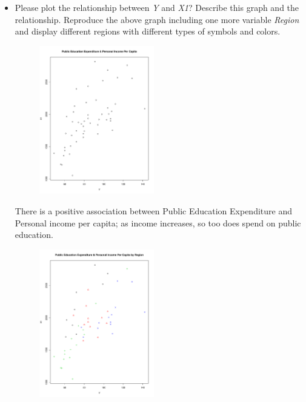 \documentclass[12pt,letterpaper]{article}
\begin{document}
\begin{itemize}
\item
Please plot the relationship between \emph{Y} and \emph{X1}? Describe this graph and the relationship. Reproduce the above graph including one more variable \emph{Region} and display different regions with different types of symbols and colors.

\begin{figure}
\includegraphics[width=50mm,scale=0.5]{YX1.pdf}
\end{figure} 
\noindent There is a positive association between Public Education Expenditure and Personal income per capita; as income increases, so too does spend on public education.

\begin{figure}
\includegraphics[width=50mm,scale=0.5]{YX1Color.pdf}
\end{figure} 

\end{itemize}
\end{document}
